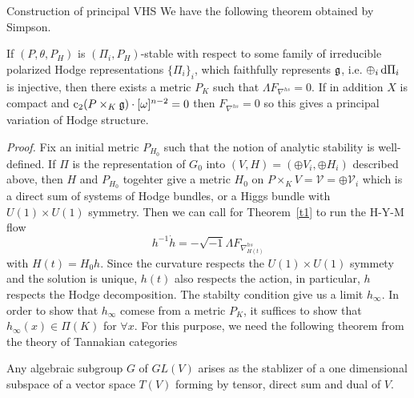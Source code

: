 \documentclass[aspectratio=169, 10pt]{beamer}
\theoremstyle{definition}
\theoremstyle{example}
\begin{document}
	\begin{frame}[allowframebreaks]{Construction of principal VHS}
		We have the following theorem obtained by Simpson.
		\begin{theorem}\label{prop8.2}
			If $(P,\theta, P_H)$ is $(\Pi_i,P_H)$-stable with respect to some family of irreducible polarized Hodge representations $\{\Pi_i\}_i$, which faithfully represents $\mathfrak{g}$, i.e. $\oplus_i \mathop{}\!\mathrm{d}\Pi_i$ is injective, then there exists a metric $P_{K}$ such that $\Lambda F_{\nabla^{hs}}=0$. If in addition $X$ is compact and $\operatorname{c}_2(P\times_K \mathfrak{g})\cdot [\omega]^{n-2}=0$ then $F_{\nabla^{hs}}=0$ so this gives a principal variation of Hodge structure. 
		\end{theorem}
		\noindent \textit{Proof.} 
		Fix an initial metric $P_{H_0}$ such that the notion of analytic stability is well-defined. If $\Pi$ is the representation of $G_0$ into $(V, H)=(\oplus V_i,\oplus H_i)$ described above, then $H$ and $P_{H_0}$ togehter give a metric $H_0$ on $P\times_K V=\mathcal{V}=\oplus\mathcal{V}_i$ which is a direct sum of systems of Hodge bundles, or a Higgs bundle with $U(1)\times U(1)$ symmetry. Then we can call for Theorem~\ref{t1} to run the H-Y-M flow 
		\[
		h^{-1}\dot{h}=-\sqrt{-1}\Lambda F_{\nabla^{hs}_{H(t)}}
		\]
		with $H(t)=H_0 h$. Since the curvature respects the $U(1)\times U(1)$ symmety and  the solution is unique, $h(t)$ also respects the action, in particular, $h$ respects the Hodge decomposition. The stabilty condition give us a limit $h_\infty$. In order to show that $h_\infty$ comese from a metric $P_K$, it suffices to show that $h_\infty(x)\in \Pi(K)$ for $\forall x$. For this purpose, we need the following theorem from the theory of Tannakian categories
		\begin{theorem}[Chevalley]
			Any algebraic subgroup $G$ of $GL(V)$ arises as the stablizer of a one dimensional subspace of a vector space $T(V)$ forming by tensor, direct sum and dual of $V$.
		\end{theorem}

\end{frame}
\end{document}
